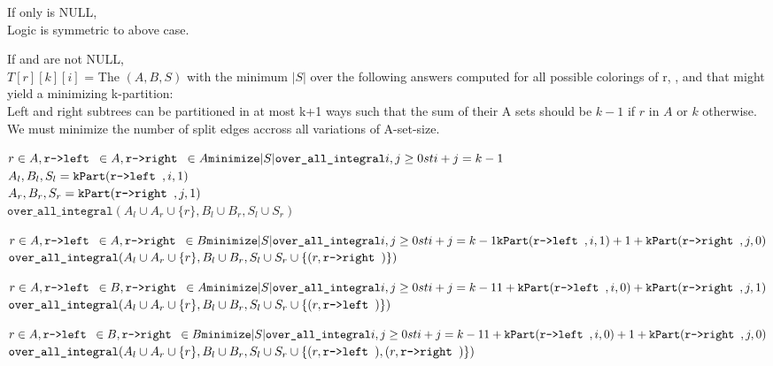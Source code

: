 \documentclass[11pt]{article}
\begin{document}
\begin{indentmore}
\begin{indentmore}
    If only \rright is NULL,\\
        Logic is symmetric to above case.

    If \rleft and \rright are not NULL,\\
        $T[r][k][i]$ = The $(A,B,S)$ with the minimum $|S|$ over the following answers computed for all possible colorings of r, \rright, and \rleft that might yield a minimizing k-partition:\\
                Left and right subtrees can be partitioned in at most k+1 ways such that the sum of their A sets should be $k-1$ if $r$ in $A$ or $k$ otherwise.\\
                We must minimize the number of split edges accross all variations of A-set-size.

          $r \in A, \texttt{r->left } \in A, \texttt{r->right } \in A\\
              \texttt{minimize} |S| \texttt{over\_all\_integral} i,j \geq 0 st i+j = k-1$\\
                $A_l, B_l, S_l = \mathtt{kPart}(\texttt{r->left },i,1)$\\
                $A_r, B_r, S_r = \mathtt{kPart}(\texttt{r->right },j,1)$\\
                $\texttt{over\_all\_integral} (A_l \cup A_r \cup \{r\},B_l \cup B_r,S_l \cup S_r)$

          $r \in A, \texttt{r->left } \in A, \texttt{r->right } \in B\\
              \texttt{minimize} |S| \texttt{over\_all\_integral} i,j \geq 0 st i+j = k-1\\
                    \mathtt{kPart}(\texttt{r->left },i,1) + 1 + \mathtt{kPart}(\texttt{r->right },j,0)$\\
                $\texttt{over\_all\_integral} (A_l \cup A_r \cup \{r\},B_l \cup B_r,S_l \cup S_r \cup \{(r, \texttt{r->right })\})$

          $r \in A, \texttt{r->left } \in B, \texttt{r->right } \in A\\
              \texttt{minimize} |S| \texttt{over\_all\_integral} i,j \geq 0 st i+j = k-1\\
                1 + \mathtt{kPart}(\texttt{r->left },i,0) +     \mathtt{kPart}(\texttt{r->right },j,1)$\\
                $\texttt{over\_all\_integral} (A_l \cup A_r \cup \{r\},B_l \cup B_r,S_l \cup S_r \cup \{(r, \texttt{r->left })\})$

          $r \in A, \texttt{r->left } \in B, \texttt{r->right } \in B\\
              \texttt{minimize} |S| \texttt{over\_all\_integral} i,j \geq 0 st i+j = k-1\\
                1 + \mathtt{kPart}(\texttt{r->left },i,0) + 1 + \mathtt{kPart}(\texttt{r->right },j,0)$\\
                $\texttt{over\_all\_integral} (A_l \cup A_r \cup \{r\},B_l \cup B_r,S_l \cup S_r \cup \{(r, \texttt{r->left }),(r, \texttt{r->right })\})$


\end{indentmore}
\end{indentmore}
\end{document}
